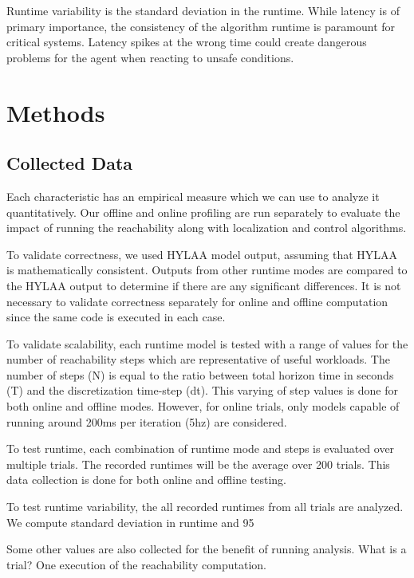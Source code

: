 \documentclass[runningheads]{llncs}
\begin{document}
Runtime variability is the standard deviation in the runtime. While latency is of primary importance, the consistency of the algorithm runtime is paramount for critical systems. Latency spikes at the wrong time could create dangerous problems for the agent when reacting to unsafe conditions. 

\section{Methods}
\subsection{Collected Data}
Each characteristic has an empirical measure which we can use to analyze it quantitatively. Our offline and online profiling are run separately to evaluate the impact of running the reachability along with localization and control algorithms.

To validate correctness, we used HYLAA model output, assuming that HYLAA is mathematically consistent. Outputs from other runtime modes are compared to the HYLAA output to determine if there are any significant differences. It is not necessary to validate correctness separately for online and offline computation since the same code is executed in each case.

To validate scalability, each runtime model is tested with a range of values for the number of reachability steps which are representative of useful workloads. The number of steps (N) is equal to the ratio between total horizon time in seconds (T) and the discretization time-step (dt). This varying of step values is done for both online and offline modes. However, for online trials, only models capable of running around 200ms per iteration (5hz) are considered.

To test runtime, each combination of runtime mode and steps is evaluated over multiple trials. The recorded runtimes will be the average over 200 trials. This data collection is done for both online and offline testing.

To test runtime variability, the all recorded runtimes from all trials are analyzed. We compute standard deviation in runtime and 95%

Some other values are also collected for the benefit of running analysis. 
What is a trial? One execution of the reachability computation.  
\end{document}
